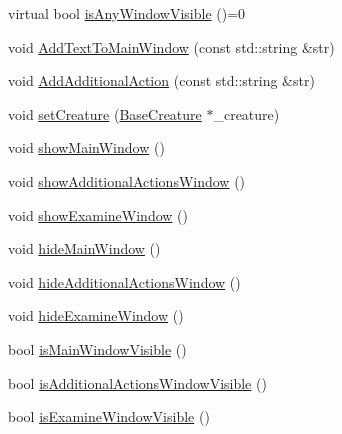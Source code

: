\begin{DoxyCompactItemize}
virtual bool \mbox{\hyperlink{class_selection_window_ad68953313a12ca42cafea68e15077c86}{is\+Any\+Window\+Visible}} ()=0
\item 
void \mbox{\hyperlink{class_selection_window_aa423c4b3c042949c8c7edfec26355e95}{Add\+Text\+To\+Main\+Window}} (const std\+::string \&str)
\item 
void \mbox{\hyperlink{class_selection_window_ad520a06caa0f206afcd0f07eb2489066}{Add\+Additional\+Action}} (const std\+::string \&str)
\item 
void \mbox{\hyperlink{class_selection_window_a870a261488489d8407da1cfacefa2724}{set\+Creature}} (\mbox{\hyperlink{class_base_creature}{Base\+Creature}} $\ast$\+\_\+creature)
\item 
void \mbox{\hyperlink{class_selection_window_aeabddc05d1291b585ef54bec617a3821}{show\+Main\+Window}} ()
\item 
void \mbox{\hyperlink{class_selection_window_a07fe0f63dda5073c165d5f6dd0a0d998}{show\+Additional\+Actions\+Window}} ()
\item 
void \mbox{\hyperlink{class_selection_window_aef0270b4c082af871e8257d3cfe5a1ce}{show\+Examine\+Window}} ()
\item 
void \mbox{\hyperlink{class_selection_window_a94b39debec610af4bba8d53e92618876}{hide\+Main\+Window}} ()
\item 
void \mbox{\hyperlink{class_selection_window_a1008dc5a1719e62a1017d0603f7560c1}{hide\+Additional\+Actions\+Window}} ()
\item 
void \mbox{\hyperlink{class_selection_window_a6b24ed933c8d785bda07ed9fd2283a18}{hide\+Examine\+Window}} ()
\item 
bool \mbox{\hyperlink{class_selection_window_a99e0308a6f3478e88e6d5554a59ddb12}{is\+Main\+Window\+Visible}} ()
\item 
bool \mbox{\hyperlink{class_selection_window_a3602db55b8338439a3df5db287b1f54f}{is\+Additional\+Actions\+Window\+Visible}} ()
\item 
bool \mbox{\hyperlink{class_selection_window_a766ad8cd04212a28a00a365c88c6c3df}{is\+Examine\+Window\+Visible}} ()
\end{DoxyCompactItemize}

